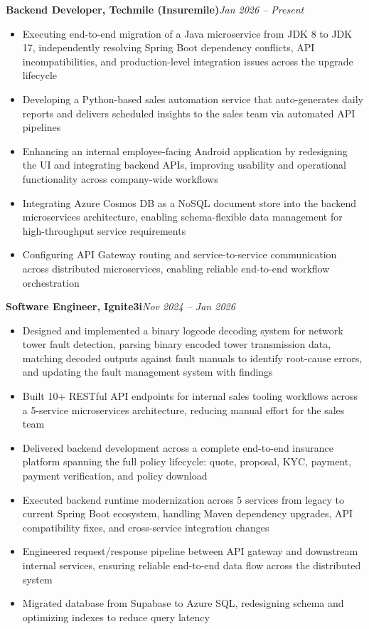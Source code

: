 \documentclass[10pt, a4paper]{article}
\newcommand{\roleheader}[3]{%
  \noindent\textbf{#1, #2}\hfill\textit{#3}
}
\begin{document}
\roleheader{Backend Developer}{Techmile (Insuremile)}{Jan 2026 -- Present}
\begin{itemize}
    \item Executing end-to-end migration of a Java microservice from JDK 8 to JDK 17, independently resolving Spring Boot dependency conflicts, API incompatibilities, and production-level integration issues across the upgrade lifecycle
    \item Developing a Python-based sales automation service that auto-generates daily reports and delivers scheduled insights to the sales team via automated API pipelines
    \item Enhancing an internal employee-facing Android application by redesigning the UI and integrating backend APIs, improving usability and operational functionality across company-wide workflows
    \item Integrating Azure Cosmos DB as a NoSQL document store into the backend microservices architecture, enabling schema-flexible data management for high-throughput service requirements
    \item Configuring API Gateway routing and service-to-service communication across distributed microservices, enabling reliable end-to-end workflow orchestration
\end{itemize}

\vspace{4pt}

\roleheader{Software Engineer}{Ignite3i}{Nov 2024 -- Jan 2026}
\begin{itemize}
    \item Designed and implemented a binary logcode decoding system for network tower fault detection, parsing binary encoded tower transmission data, matching decoded outputs against fault manuals to identify root-cause errors, and updating the fault management system with findings
    \item Built 10+ RESTful API endpoints for internal sales tooling workflows across a 5-service microservices architecture, reducing manual effort for the sales team
    \item Delivered backend development across a complete end-to-end insurance platform spanning the full policy lifecycle: quote, proposal, KYC, payment, payment verification, and policy download
    \item Executed backend runtime modernization across 5 services from legacy to current Spring Boot ecosystem, handling Maven dependency upgrades, API compatibility fixes, and cross-service integration changes
    \item Engineered request/response pipeline between API gateway and downstream internal services, ensuring reliable end-to-end data flow across the distributed system
    \item Migrated database from Supabase to Azure SQL, redesigning schema and optimizing indexes to reduce query latency
\end{itemize}
\end{document}
